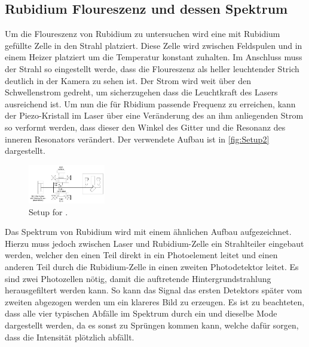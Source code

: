 \subsection{Rubidium Floureszenz und dessen Spektrum}
\label{sec:Rubi}
Um die Floureszenz von Rubidium zu untersuchen wird eine mit Rubidium gefüllte Zelle in den Strahl platziert. Diese Zelle wird zwischen Feldspulen und in einem Heizer platziert um die Temperatur konstant zuhalten.
Im Anschluss muss der Strahl so eingestellt werde, dass die Floureszenz als heller leuchtender Strich deutlich in der Kamera zu sehen ist. Der Strom wird weit über den Schwellenstrom gedreht, um sicherzugehen dass die Leuchtkraft des Lasers
ausreichend ist. Um nun die für Rbidium passende Frequenz zu erreichen, kann der Piezo-Kristall im Laser über eine Veränderung des an ihm anliegenden Strom so verformt werden, dass dieser 
den Winkel des Gitter und die Resonanz des inneren Resonators verändert.
Der verwendete Aufbau ist in \autoref{fig:Setup2} dargestellt.
\begin{figure}
    \begin{center}
        \includegraphics[width=0.3\textwidth]{Setup2.pdf}
        \caption{Setup for \cite{ap60}.}
        \label{fig:Setup2}
    \end{center} 
\end{figure}
Das Spektrum von Rubidium wird mit einem ähnlichen Aufbau aufgezeichnet. Hierzu muss jedoch zwischen Laser und Rubidium-Zelle ein Strahlteiler eingebaut werden, welcher den einen Teil direkt in ein Photoelement leitet
und einen anderen Teil durch die Rubidium-Zelle in einen zweiten Photodetektor leitet.
Es sind zwei Photozellen nötig, damit die auftretende Hintergrundstrahlung herausgefiltert werden kann. So kann das Signal das ersten Detektors später vom zweiten abgezogen werden um ein klareres Bild zu erzeugen.
Es ist zu beachteten, dass alle vier typischen Abfälle im Spektrum durch ein und dieselbe Mode dargestellt werden, da es sonst zu Sprüngen kommen kann, welche dafür sorgen, dass die Intensität plötzlich abfällt.